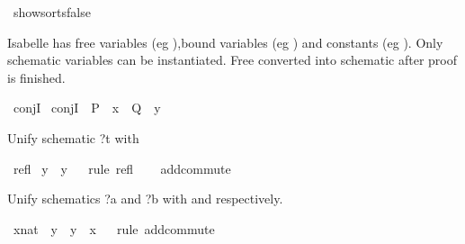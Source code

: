 \begin{isabellebody}
\ {\isacharbrackleft}{\kern0pt}{\isacharbrackleft}{\kern0pt}show{\isacharunderscore}{\kern0pt}sorts{\isacharequal}{\kern0pt}false{\isacharbrackright}{\kern0pt}{\isacharbrackright}{\kern0pt}%
\begin{isamarkuptext}%
Isabelle has free variables (eg ),bound variables (eg ) and constants (eg ).
 Only schematic variables can be instantiated.
 Free converted into schematic after proof is finished.%
\end{isamarkuptext}\isamarkuptrue%
\isamarkupfalse%
\ conjI\isanewline
{}\isamarkupfalse%
\ conjI\ {\isacharbrackleft}{\kern0pt}\ {\isacharquery}{\kern0pt}P\ {\isacharequal}{\kern0pt}\ {\isachardoublequoteopen}x{\isachardoublequoteclose}\ \ {\isacharquery}{\kern0pt}Q\ {\isacharequal}{\kern0pt}\ {\isachardoublequoteopen}y{\isachardoublequoteclose}{\isacharbrackright}{\kern0pt}%
\isadelimdocument
%
\endisadelimdocument
%
\isatagdocument
%
\isamarkuptrue%
%
\endisatagdocument
{\isafolddocument}%
%
\isadelimdocument
%
\endisadelimdocument
%
\begin{isamarkuptext}%
Unify schematic ?t with %
\end{isamarkuptext}\isamarkuptrue%
\isamarkupfalse%
\ refl\isanewline
{}\isamarkupfalse%
\ {\isachardoublequoteopen}y\ {\isacharequal}{\kern0pt}\ y{\isachardoublequoteclose}\isanewline
%
\isadelimproof
\ \ %
\endisadelimproof
%
\isatagproof
{}\isamarkupfalse%
{\isacharparenleft}{\kern0pt}rule\ refl{\isacharparenright}{\kern0pt}\isanewline
\ \ \isamarkupfalse%
%
\endisatagproof
{\isafoldproof}%
%
\isadelimproof
\isanewline
%
\endisadelimproof
\isanewline
{}\isamarkupfalse%
\ add{\isachardot}{\kern0pt}commute%
\begin{isamarkuptext}%
Unify schematics ?a and ?b with  and  respectively.%
\end{isamarkuptext}\isamarkuptrue%
\isamarkupfalse%
\ {\isachardoublequoteopen}{\isacharparenleft}{\kern0pt}x{\isacharcolon}{\kern0pt}{\isacharcolon}{\kern0pt}nat{\isacharparenright}{\kern0pt}\ {\isacharplus}{\kern0pt}\ y\ {\isacharequal}{\kern0pt}\ y\ {\isacharplus}{\kern0pt}\ x{\isachardoublequoteclose}\isanewline
%
\isadelimproof
\ \ %
\endisadelimproof
%
\isatagproof
{}\isamarkupfalse%
{\isacharparenleft}{\kern0pt}rule\ add{\isachardot}{\kern0pt}commute{\isacharparenright}{\kern0pt}\isanewline

\end{isabellebody}
